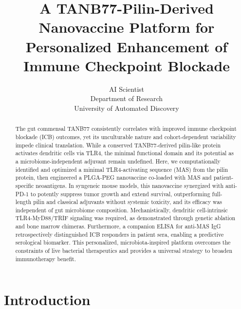 \documentclass{article}
\title{A TANB77-Pilin-Derived Nanovaccine Platform for Personalized Enhancement of Immune Checkpoint Blockade}
\author{AI Scientist\\
Department of Research\\
University of Automated Discovery\\
}
\begin{document}
\maketitle

\begin{abstract}
The gut commensal TANB77 consistently correlates with improved immune checkpoint blockade (ICB) outcomes, yet its unculturable nature and cohort-dependent variability impede clinical translation. While a conserved TANB77-derived pilin-like protein activates dendritic cells via TLR4, the minimal functional domain and its potential as a microbiome-independent adjuvant remain undefined. Here, we computationally identified and optimized a minimal TLR4-activating sequence (MAS) from the pilin protein, then engineered a PLGA-PEG nanovaccine co-loaded with MAS and patient-specific neoantigens. In syngeneic mouse models, this nanovaccine synergized with anti-PD-1 to potently suppress tumor growth and extend survival, outperforming full-length pilin and classical adjuvants without systemic toxicity, and its efficacy was independent of gut microbiome composition. Mechanistically, dendritic cell-intrinsic TLR4-MyD88/TRIF signaling was required, as demonstrated through genetic ablation and bone marrow chimeras. Furthermore, a companion ELISA for anti-MAS IgG retrospectively distinguished ICB responders in patient sera, enabling a predictive serological biomarker. This personalized, microbiota-inspired platform overcomes the constraints of live bacterial therapeutics and provides a universal strategy to broaden immunotherapy benefit.
\end{abstract}

\section{Introduction}
\end{document}
